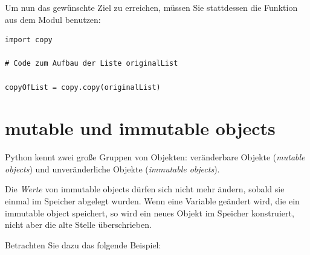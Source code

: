 Um nun das gewünschte Ziel zu erreichen, müssen Sie stattdessen die Funktion  aus dem Modul  benutzen:

\begin{codebox}
\begin{verbatim}
import copy

# Code zum Aufbau der Liste originalList

copyOfList = copy.copy(originalList)
\end{verbatim}
\end{codebox}

\section{mutable und immutable objects}
Python kennt zwei große Gruppen von Objekten: veränderbare Objekte (\emph{mutable objects}) und unveränderliche Objekte (\emph{immutable objects}).

Die \emph{Werte} von immutable objects dürfen sich nicht mehr ändern, sobald sie einmal im Speicher abgelegt wurden. Wenn eine Variable geändert wird, die ein immutable object speichert, so wird ein neues Objekt im Speicher konstruiert, nicht aber die alte Stelle überschrieben.

Betrachten Sie dazu das folgende Beispiel:


